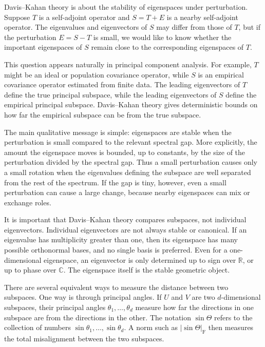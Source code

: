 \documentclass[11pt]{article}
\theoremstyle{remark}
\begin{document}
Davis--Kahan theory is about the stability of eigenspaces under perturbation.
Suppose $T$ is a self-adjoint operator and $S=T+E$ is a nearby self-adjoint
operator. The eigenvalues and eigenvectors of $S$ may differ from those of $T$,
but if the perturbation $E=S-T$ is small, we would like to know whether the
important eigenspaces of $S$ remain close to the corresponding eigenspaces of
$T$.

This question appears naturally in principal component analysis. For example,
$T$ might be an ideal or population covariance operator, while $S$ is an
empirical covariance operator estimated from finite data. The leading
eigenvectors of $T$ define the true principal subspace, while the leading
eigenvectors of $S$ define the empirical principal subspace. Davis--Kahan theory
gives deterministic bounds on how far the empirical subspace can be from the true
subspace.

The main qualitative message is simple: eigenspaces are stable when the
perturbation is small compared to the relevant spectral gap. More explicitly,
the amount the eigenspace moves is bounded, up to constants, by the size of the
perturbation divided by the spectral gap. Thus a small perturbation causes only
a small rotation when the eigenvalues defining the subspace are well separated
from the rest of the spectrum. If the gap is tiny, however, even a small
perturbation can cause a large change, because nearby eigenspaces can mix or
exchange roles.

It is important that Davis--Kahan theory compares subspaces, not individual
eigenvectors. Individual eigenvectors are not always stable or canonical. If an
eigenvalue has multiplicity greater than one, then its eigenspace has many
possible orthonormal bases, and no single basis is preferred. Even for a
one-dimensional eigenspace, an eigenvector is only determined up to sign over
$\mathbb R$, or up to phase over $\mathbb C$. The eigenspace itself is the
stable geometric object.

There are several equivalent ways to measure the distance between two subspaces.
One way is through principal angles. If $U$ and $V$ are two $d$-dimensional
subspaces, their principal angles $\theta_1,\dots,\theta_d$ measure how far the
directions in one subspace are from the directions in the other. The notation
$\sin\Theta$ refers to the collection of numbers
$\sin\theta_1,\dots,\sin\theta_d$. A norm such as
$|\sin\Theta|_{\mathrm F}$ then measures the total misalignment between the two
subspaces.
\end{document}
